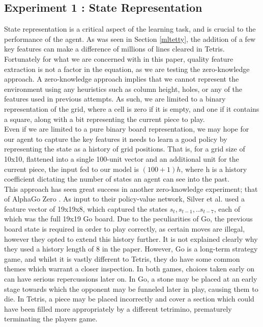 \documentclass[12pt]{article}
\begin{document}
\subsection{Experiment 1 : State Representation}\label{staterep}
State representation is a critical aspect of the learning task, and is crucial to the performance of the agent. As was seen in Section \ref{mltetty}, the addition of a few key features can make a difference of millions of lines cleared in Tetris. Fortunately for what we are concerned with in this paper, quality feature extraction is not a factor in the equation, as we are testing the zero-knowledge approach. A zero-knowledge approach implies that we cannot represent the environment using any heuristics such as column height, holes, or any of the features used in previous attempts. As such, we are limited to a binary representation of the grid, where a cell is zero if it is empty, and one if it contains a square, along with a bit representing the current piece to play. \\\newline
Even if we are limited to a pure binary board representation, we may hope for our agent to capture the key features it needs to learn a good policy by representing the state as a history of grid positions. That is, for a grid size of 10x10, flattened into a single 100-unit vector and an additional unit for the current piece, the input fed to our model is $(100+1)h$, where h is a history coefficient dictating the number of states an agent can see into the past. \\\newline
This approach has seen great success in another zero-knowledge experiment; that of AlphaGo Zero \autocite{Silver2017}. As input to their policy-value network, Silver et al. used a feature vector of 19x19x8, which captured the states $s_t, s_{t-1},..s_{t-7}$, each of which was the full 19x19 Go board. Due to the peculiarities of Go, the previous board state is required in order to play correctly, as certain moves are illegal, however they opted to extend this history further. It is not explained clearly why they used a history length of 8 in the paper. However, Go is a long-term strategy game, and whilst it is vastly different to Tetris, they do have some common themes which warrant a closer inspection. In both games, choices taken early on can have serious repercussions later on. In Go, a stone may be placed at an early stage towards which the opponent may be funneled later in play, causing them to die. In Tetris, a piece may be placed incorrectly and cover a section which could have been filled more appropriately by a different tetrimino, prematurely terminating the players game. \\\newline
\end{document}

